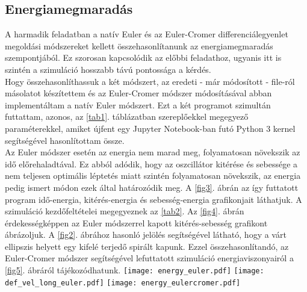 \begin{multicols}{2}
\subsection{Energiamegmaradás}
A harmadik feladatban a natív Euler és az Euler-Cromer differenciálegyenlet megoldási módszereket kellett összehasonlítanunk az energiamegmaradás szempontjából. Ez szorosan kapcsolódik az előbbi feladathoz, ugyanis itt is szintén a szimuláció hosszabb távú pontossága a kérdés. \\
Hogy összehasonlíthassuk a két módszert, az eredeti - már módosított - file-ról másolatot készítettem és az Euler-Cromer módszer módosításával abban implementáltam a natív Euler módszert. Ezt a két programot szimultán futtattam, azonos, az \ref{tab1}. táblázatban szereplőekkel megegyező paraméterekkel, amiket újfent egy Jupyter Notebook-ban futó Python 3 kernel segítségével hasonlítottam össze. \\
Az Euler módszer esetén az energia nem marad meg, folyamatosan növekszik az idő előrehaladtával. Ez abból adódik, hogy az oszcillátor kitérése és sebessége a nem teljesen optimális léptetés miatt szintén folyamatosan növekszik, az energia pedig ismert módon ezek által határozódik meg. A \ref{fig3}. ábrán az így futtatott program idő-energia, kitérés-energia és sebesség-energia grafikonjait láthatjuk. A szimuláció kezdőfeltételei megegyeznek az \ref{tab2}. Az \ref{fig4}. ábrán érdekességképpen az Euler módszerrel kapott kitérés-sebesség grafikont ábrázoljuk. A \ref{fig2}. ábrához hasonló jelölés segítségével látható, hogy a várt ellipszis helyett egy kifelé terjedő spirált kapunk. Ezzel összehasonlítandó, az Euler-Cromer módszer segítségével lefuttatott szimuláció energiaviszonyairól a \ref{fig5}. ábráról tájékozódhatunk.
\hfill \break \hfill \break
{\centering\texttt{[image: energy\_euler.pdf]}}
\label{fig3}
\hfill \break \hfill \break
{\centering\texttt{[image: def\_vel\_long\_euler.pdf]}}
\label{fig4}
\hfill \break \hfill \break
{\centering\texttt{[image: energy\_eulercromer.pdf]}}
\label{fig5}


\end{multicols}
